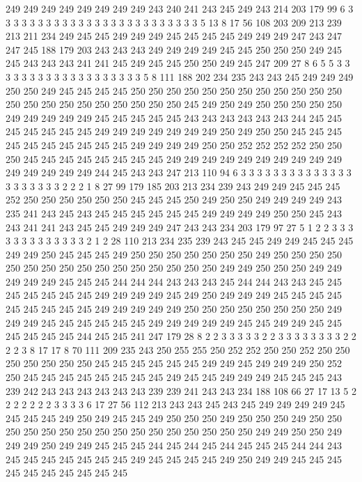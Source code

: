 249 249 249 249 249 249 249 249 243 240 241 243 245 249 243 214 203 179 99 6
3 3 3 3 3 3 3 3 3 3 3 3 3 3 3 3 3 3 3 3
3 3 3 3 3 5 13 8 17 56 108 203 209 213 239 213 211 234 249 245
245 249 249 249 245 245 245 245 249 249 249 247 243 247 247 245 188 179 203 243
243 243 249 249 249 249 245 245 250 250 250 249 245 245 243 243 243 241 241 245
249 245 245 250 250 249 245 247 209 27 8 6 5 5 3 3 3 3 3 3
3 3 3 3 3 3 3 3 3 3 3 3 3 5 8 111 188 202 234 235
243 243 245 249 249 249 250 250 249 245 245 245 245 250 250 250 250 250 250 250
250 250 250 250 250 250 250 250 250 250 250 250 250 250 250 245 249 250 249 250
250 250 250 250 249 249 249 249 249 245 245 245 245 245 243 243 243 243 243 243
244 245 245 245 245 245 245 245 249 249 249 249 249 249 249 250 249 250 250 245
245 245 245 245 245 245 245 245 245 249 249 249 249 250 250 252 252 252 252 250
250 250 245 245 245 245 245 245 245 245 249 249 249 249 249 249 249 249 249 249
249 249 249 249 249 244 245 243 243 247 213 110 94 6 3 3 3 3 3 3
3 3 3 3 3 3 3 3 3 3 3 3 3 3 3 2 2 2 1 8
27 99 179 185 203 213 234 239 243 249 249 245 245 245 252 250 250 250 250 250
250 245 245 245 250 249 250 250 249 249 249 249 243 235 241 243 245 243 245 245
245 245 245 245 249 249 249 249 250 250 245 243 243 241 241 243 245 245 249 249
249 247 243 243 234 203 179 97 27 5 1 2 2 3 3 3 3 3 3 3
3 3 3 3 3 3 2 1 2 28 110 213 234 235 239 243 245 245 249 249
245 245 245 249 249 250 245 245 245 249 250 250 250 250 250 250 250 249 250 250
250 250 250 250 250 250 250 250 250 250 250 250 250 250 249 249 250 250 250 249
249 249 249 249 245 245 245 244 244 244 243 243 243 245 244 244 243 243 245 245
245 245 245 245 245 249 249 249 249 245 249 250 249 249 249 245 245 245 245 245
245 245 245 245 249 249 249 249 249 250 250 250 250 250 250 250 250 249 249 249
245 245 245 245 245 245 249 249 249 249 249 245 245 249 249 245 245 245 245 245
245 244 245 245 241 247 179 28 8 2 2 3 3 3 3 3 2 2 3 3
3 3 3 3 3 3 2 2 2 2 3 8 17 17 8 70 111 209 235 243
250 255 255 250 252 252 250 250 252 250 250 250 250 250 250 250 245 245 245 245
245 245 249 249 245 249 249 249 250 252 250 245 245 245 245 245 245 245 245 249
245 245 249 249 249 245 245 245 243 239 242 243 243 243 243 243 243 239 239 241
243 243 234 188 108 66 27 17 13 5 2 2 2 2 2 2 2 3 3 3
3 6 17 27 56 112 213 243 243 245 243 245 249 249 249 249 245 245 245 245
249 250 249 245 245 249 250 250 250 249 250 250 250 249 250 250 250 250 250 250
250 250 250 250 250 250 250 250 250 250 249 249 250 250 249 249 249 250 249 249
245 245 245 244 245 244 245 244 245 245 245 244 244 243 245 245 245 245 245 245
245 249 245 245 245 245 249 250 249 249 245 245 245 245 245 245 245 245 245 245

